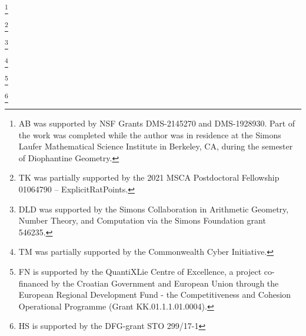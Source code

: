 
\author[Bourdon]{Abbey Bourdon}
\address{
  Abbey Bourdon,
  Wake Forest University,
  Department of Mathematics, 127 Manchester Hall, PO Box 7388, Winston-Salem, NC 27109
}
\thanks{AB was supported by NSF Grants DMS-2145270 and DMS-1928930. Part of the work was completed while the author was in residence at the Simons Laufer Mathematical Science Institute in Berkeley, CA, during the semester of Diophantine Geometry.}

\author[Hashimoto]{Sachi Hashimoto}
\address{  Sachi Hashimoto, Department of Mathematics,
  Brown University,
  Box 1917,
  151 Thayer Street,
  Providence, RI, 02912
}


\author[Keller]{Timo Keller}
\address{Timo Keller, Rijksuniveriteit Groningen, Bernoulli Institute, Bernoulliborg, Nijenborgh 9, 9747 AG Groningen, The Netherlands (previously: Leibniz Universität Hannover, Institut für Algebra, Zahlentheorie und Diskrete Mathematik, Welfengarten 1, 30167 Hannover, Germany)}
\thanks{%
  TK was partially supported by the 2021 MSCA Postdoctoral Fellowship 01064790 -- ExplicitRatPoints.
}

\author[Klagsbrun]{Zev Klagsbrun}
\address{Zev Klagsbrun, Center for Communications Research, San Diego, CA}



\author[Lowry-Duda]{David Lowry-Duda}
\address{%
  David Lowry-Duda, ICERM, 121 South Main Street, Box E, 11th Floor,
  Providence, RI, 02903
}
\thanks{%
  DLD was supported by the Simons Collaboration in Arithmetic Geometry, Number
  Theory, and Computation via the Simons Foundation grant 546235.
}
\author[Morrison]{Travis Morrison}
\address{Travis Morrison, 
Virginia Tech Department of Mathematics, 
226 Stanger Street, 
24061 Blacksburg, VA USA}
\thanks{TM was partially supported by the Commonwealth Cyber Initiative.}

\author[Najman]{Filip Najman}
\address{
Filip Najman, University of Zagreb, Bijeni\v{c}ka Cesta 30, 10000 Zagreb, Croatia
}
\thanks{FN is supported by the QuantiXLie Centre of Excellence, a
  project co-financed by the Croatian Government and European Union
  through the European Regional Development Fund - the Competitiveness
  and Cohesion Operational Programme (Grant KK.01.1.1.01.0004).}

\author[Shukla]{Himanshu Shukla}
\address{Himanshu Shukla, Mathematisches Institut, Uiversit\"{a}t Bayreuth, Universit\"{a}tstrasse 30, 95444 Bayreuth, Germany}
\thanks{HS is supported by the DFG-grant STO 299/17-1}

